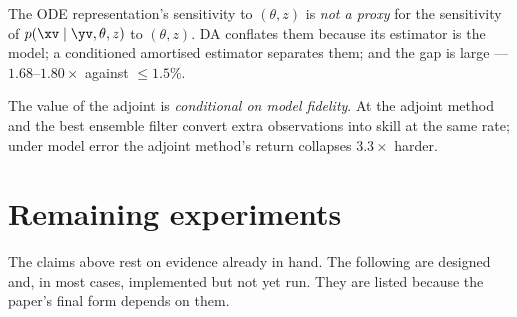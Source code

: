 \begin{description}[leftmargin=2.2em,style=nextline]
    The ODE representation's sensitivity to $(\theta, z)$ is \emph{not a proxy}
    for the sensitivity of $p(\xv \mid \yv, \theta, z)$ to $(\theta, z)$. DA
    conflates them because its estimator is the model; a conditioned amortised
    estimator separates them; and the gap is large --- $1.68$--$1.80\times$
    against $\leq 1.5\%$.
  \item[\textbf{C7 (H4, classical corollary).}]
    The value of the adjoint is \emph{conditional on model fidelity}. At \Sz{}
    the adjoint method and the best ensemble filter convert extra observations
    into skill at the same rate; under model error the adjoint method's return
    collapses $3.3\times$ harder.
\end{description}

\section{Remaining experiments}
\label{sec:experiments}

The claims above rest on evidence already in hand. The following are designed
and, in most cases, implemented but not yet run. They are listed because the
paper's final form depends on them.

